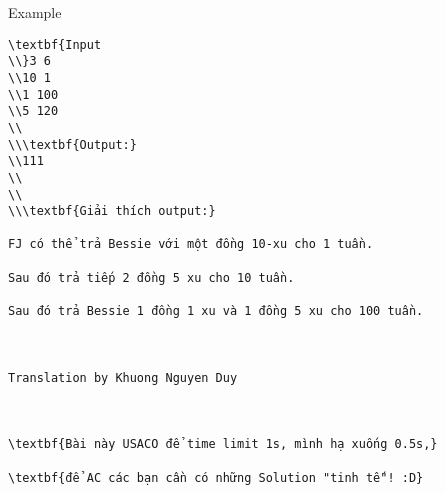 Example
\begin{verbatim}
\textbf{Input
\\}3 6
\\10 1
\\1 100
\\5 120
\\
\\\textbf{Output:}
\\111
\\
\\
\\\textbf{Giải thích output:}

FJ có thể trả Bessie với một đồng 10-xu cho 1 tuần.

Sau đó trả tiếp 2 đồng 5 xu cho 10 tuần.

Sau đó trả Bessie 1 đồng 1 xu và 1 đồng 5 xu cho 100 tuần.

 

Translation by Khuong Nguyen Duy

 

\textbf{Bài này USACO để time limit 1s, mình hạ xuống 0.5s,}

\textbf{để AC các bạn cần có những Solution "tinh tế"! :D}\end{verbatim}
